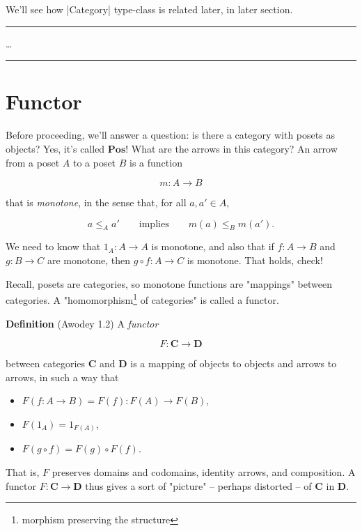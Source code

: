 \documentclass{article}
\begin{document}
We'll see how |Category| type-class is related later, in later section.

\rule{\textwidth}{1pt}
\ldots
\rule{\textwidth}{1pt}

\section{Functor}

Before proceeding, we'll answer a question: is there a category
with posets as objects? Yes, it's called $\mathbf{Pos}$!
What are the arrows in this category?
An arrow from a poset $A$ to a poset $B$ is a function

\begin{equation*}
m : A \to B
\end{equation*}

that is \emph{monotone}, in the sense that, for all $a, a' \in A$,

\begin{equation*}
a \le_A a' \qquad\text{implies}\qquad m(a) \le_B m(a').
\end{equation*}

We need to know that $1_A : A \to A$ is monotone, and also
that if $f : A \to B$ and $g : B \to C$ are monotone, then $g \circ f : A \to C$
is monotone. That holds, check!

Recall, posets are categories, so monotone functions are "mappings" between
categories. A "homomorphism\footnote{morphism preserving the structure} of categories"
is called a functor.

\begin{definition}[Awodey 1.2]\textbf{Definition} (Awodey 1.2)
A \emph{functor}

\begin{equation*}
F : \mathbf{C} \to \mathbf{D}
\end{equation*}

between categories $\mathbf{C}$ and $\mathbf{D}$ is a mapping of objects
to objects and arrows to arrows, in such a way that
\begin{itemize}
\item $F (f : A \to B) = F(f) : F(A) \to F(B)$,
\item $F(1_A) = 1_{F(A)}$,
\item $F(g \circ f) = F(g) \circ F(f)$.
\end{itemize}
That is, $F$ preserves domains and codomains, identity arrows,
and composition. A functor $F : \mathbf{C} \to \mathbf{D}$ thus gives
a sort of "picture" -- perhaps distorted -- of $\mathbf{C}$ in $\mathbf{D}$.
\end{definition}
\end{document}
